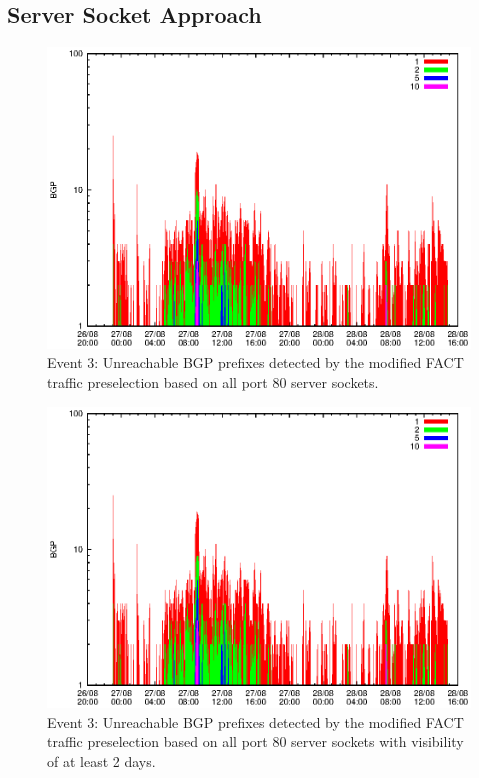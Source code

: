 \subsection{Server Socket Approach} 
\begin{figure}
	[p] \centering 
	\includegraphics[width=0.75\linewidth]{images/events/2010_08_27/bgp_log_allPort80SES.eps} \caption{Event 3: Unreachable BGP prefixes detected by the modified FACT traffic preselection based on all port 80 server sockets.} 
	\label{fig:RIPE_FACT_allSES80} 
\end{figure}
\begin{figure}
	[p] \centering 
	\includegraphics[width=0.75\linewidth]{images/events/2010_08_27/bgp_log_port80_Set_stab_0_vts_2.eps} \caption{Event 3: Unreachable BGP prefixes detected by the modified FACT traffic preselection based on all port 80 server sockets with visibility of at least 2 days.} 
	\label{fig:RIPE_FACT_allSES80VTS2} 
\end{figure}
